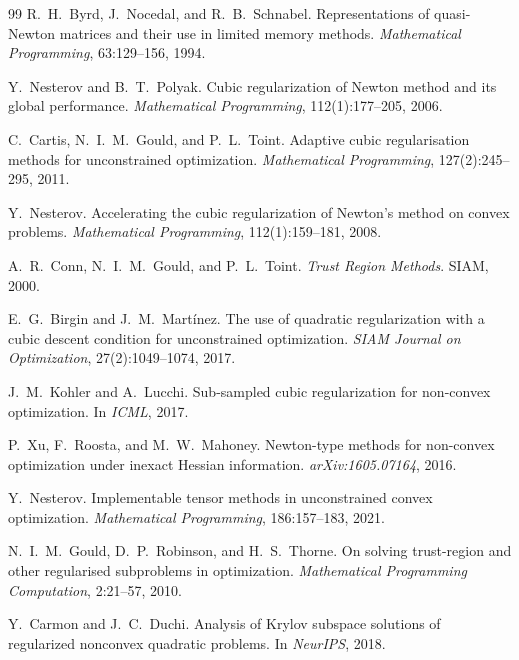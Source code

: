 \documentclass[11pt,a4paper]{article}
\theoremstyle{plain}
\theoremstyle{definition}
\begin{document}
\begin{thebibliography}{99}
R.~H.~Byrd, J.~Nocedal, and R.~B.~Schnabel.
Representations of quasi-Newton matrices and their use in limited memory methods.
\textit{Mathematical Programming}, 63:129--156, 1994.

Y.~Nesterov and B.~T.~Polyak.
Cubic regularization of Newton method and its global performance.
\textit{Mathematical Programming}, 112(1):177--205, 2006.

C.~Cartis, N.~I.~M.~Gould, and P.~L.~Toint.
Adaptive cubic regularisation methods for unconstrained optimization.
\textit{Mathematical Programming}, 127(2):245--295, 2011.

Y.~Nesterov.
Accelerating the cubic regularization of Newton's method on convex problems.
\textit{Mathematical Programming}, 112(1):159--181, 2008.

A.~R.~Conn, N.~I.~M.~Gould, and P.~L.~Toint.
\textit{Trust Region Methods}.
SIAM, 2000.

E.~G.~Birgin and J.~M.~Mart\'inez.
The use of quadratic regularization with a cubic descent condition for unconstrained optimization.
\textit{SIAM Journal on Optimization}, 27(2):1049--1074, 2017.

J.~M.~Kohler and A.~Lucchi.
Sub-sampled cubic regularization for non-convex optimization.
In \textit{ICML}, 2017.

P.~Xu, F.~Roosta, and M.~W.~Mahoney.
Newton-type methods for non-convex optimization under inexact Hessian information.
\textit{arXiv:1605.07164}, 2016.

Y.~Nesterov.
Implementable tensor methods in unconstrained convex optimization.
\textit{Mathematical Programming}, 186:157--183, 2021.

N.~I.~M.~Gould, D.~P.~Robinson, and H.~S.~Thorne.
On solving trust-region and other regularised subproblems in optimization.
\textit{Mathematical Programming Computation}, 2:21--57, 2010.

Y.~Carmon and J.~C.~Duchi.
Analysis of Krylov subspace solutions of regularized nonconvex quadratic problems.
In \textit{NeurIPS}, 2018.
\end{thebibliography}
\end{document}
